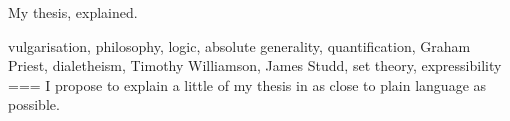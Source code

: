 My thesis, explained.

vulgarisation, philosophy, logic, absolute generality, quantification, Graham Priest, dialetheism, Timothy Williamson, James Studd, set theory, expressibility
===
I propose to explain a little of my thesis \parencite{loo2024} in as close to plain language as possible.